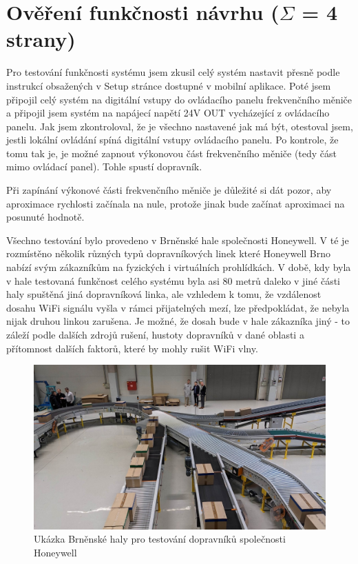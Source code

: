 \chapter{Ověření funkčnosti návrhu ($\Sigma$ = 4 strany)}
Pro testování funkčnosti systému jsem zkusil celý systém nastavit přesně podle instrukcí obsažených v Setup stránce dostupné v mobilní aplikace. Poté jsem připojil celý systém na digitální vstupy do ovládacího panelu frekvenčního měniče a připojil jsem systém na napájecí napětí 24V OUT vycházející z ovládacího panelu. Jak jsem zkontroloval, že je všechno nastavené jak má být, otestoval jsem, jestli lokální ovládání spíná digitální vstupy ovládacího panelu. Po kontrole, že tomu tak je, je možné zapnout výkonovou část frekvenčního měniče (tedy část mimo ovládací panel). Tohle spustí dopravník.

Při zapínání výkonové části frekvenčního měniče je důležité si dát pozor, aby aproximace rychlosti začínala na nule, protože jinak bude začínat aproximaci na posunuté hodnotě.

Všechno testování bylo provedeno v Brněnské hale společnosti Honeywell. V té je rozmístěno několik různých typů dopravníkových linek které Honeywell Brno nabízí svým zákazníkům na fyzických i virtuálních prohlídkách. V době, kdy byla v hale testovaná funkčnost celého systému byla asi 80 metrů daleko v jiné části haly spuštěná jiná dopravníková linka, ale vzhledem k tomu, že vzdálenost dosahu WiFi signálu vyšla v rámci přijatelných mezí, lze předpokládat, že nebyla nijak druhou linkou zarušena. Je možné, že dosah bude v hale zákazníka jiný - to záleží podle dalších zdrojů rušení, hustoty dopravníků v dané oblasti a přítomnost dalších faktorů, které by mohly rušit WiFi vlny.

\begin{figure}
    \centering
    \includegraphics[width=0.75\linewidth]{images/BrnenskaHoneywellHala.png}
    \caption{Ukázka Brněnské haly pro testování dopravníků společnosti Honeywell \cite{HoneywellHala}}
    \label{fig:BrnenskaHoneywellHala}
\end{figure}

